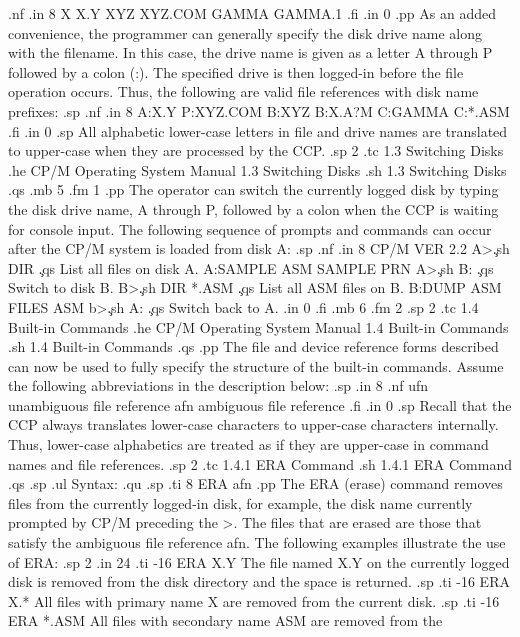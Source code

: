 .nf
.in 8
X
X.Y
XYZ
XYZ.COM
GAMMA
GAMMA.1
.fi
.in 0
.pp
As an added convenience, the programmer can generally specify the disk drive
name along with the filename.  In this case, the drive name is given as a
letter A through P followed by a colon (:).  The specified drive is
then logged-in before the file operation occurs.  Thus, the following are
valid file references with disk name prefixes:
.sp
.nf
.in 8
A:X.Y
P:XYZ.COM
B:XYZ
B:X.A?M
C:GAMMA
C:*.ASM
.fi
.in 0
.sp
All alphabetic lower-case letters in file and drive names are translated to
upper-case when they are processed by the CCP.
.sp 2
.tc    1.3  Switching Disks
.he CP/M Operating System Manual                 1.3  Switching Disks
.sh
1.3  Switching Disks
.qs
.mb 5
.fm 1
.pp
The operator can switch the currently logged disk by typing the disk drive
name, A through P, followed by a colon when the CCP is waiting for
console input.  The following sequence of prompts and commands
can occur after the CP/M system is loaded from disk A:
.sp
.nf
.in 8
CP/M VER 2.2
A>\c
.sh
DIR                     \c
.qs
List all files on disk A.
A:SAMPLE ASM SAMPLE PRN
A>\c
.sh
B:                      \c
.qs
Switch to disk B.
B>\c
.sh
DIR *.ASM               \c
.qs
List all ASM files on B.
B:DUMP ASM FILES ASM
b>\c
.sh
A:                      \c
.qs
Switch back to A.
.in 0
.fi
.mb 6
.fm 2
.sp 2
.tc    1.4  Built-in Commands
.he CP/M Operating System Manual               1.4  Built-in Commands
.sh
1.4  Built-in Commands
.qs
.pp
The file and device reference forms described can now be used to fully
specify the structure of the built-in commands.  Assume the following
abbreviations in the description below:
.sp
.in 8
.nf
ufn   unambiguous file reference
afn   ambiguous file reference
.fi
.in 0
.sp
Recall that the CCP always translates lower-case characters to upper-case
characters internally.  Thus, lower-case alphabetics are treated as if they
are upper-case in command names and file references.
.sp 2
.tc         1.4.1  ERA Command
.sh
1.4.1  ERA Command
.qs
.sp
.ul
Syntax:
.qu
.sp
.ti 8
ERA afn
.pp
The ERA (erase) command removes files from the currently logged-in
disk, for example, the disk name currently prompted by CP/M preceding the >.
The files that are erased are those that satisfy the ambiguous file
reference afn.  The following examples illustrate the use of ERA:
.sp 2
.in 24
.ti -16
ERA X.Y         The file named X.Y on the currently logged disk is removed
from the disk directory and the space is returned.
.sp
.ti -16
ERA X.*         All files with primary name X are removed from the current
disk.
.sp
.ti -16
ERA *.ASM       All files with secondary name ASM are removed from the
